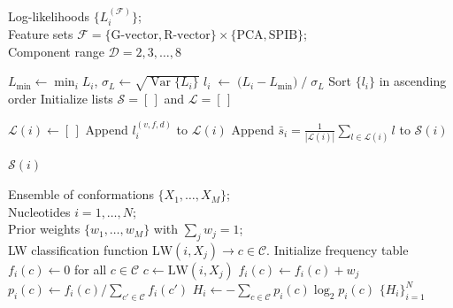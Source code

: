 \begin{algorithm}[H]
  \caption{RNAnneal Score}
  \label{ch6:alg:rnanneal-score}
  \begin{algorithmic}[1]
    \REQUIRE
    Log-likelihoods $\{L_{i}^{(\mathcal{F})}\}$;\\
    Feature sets $\mathcal{F}=\{\text{G-vector},\text{R-vector}\}\times\{\text{PCA},\text{SPIB}\}$;\\
    Component range $\mathcal{D}=2,3,\ldots,8$

    \STATE $\displaystyle L_{\min}\leftarrow\min_{i}L_{i}$,\quad
           $\displaystyle\sigma_{L}\leftarrow\sqrt{\operatorname{Var}\{L_{i}\}}$
      \STATE $\displaystyle l_{i}\;\leftarrow\;
              {\bigl(L_{i}-L_{\min}\bigr)}\;
              {/\;\sigma_{L}}$ 
    \ENDFOR
      \STATE Sort $\{l_{i}\}$ in ascending order
      \STATE Initialize lists $\mathcal{S} = [\,]$ and $\mathcal{L} = [\,]$

        \STATE $\mathcal{L}(i)\gets[\,]$
              \STATE Append $l_{i}^{(v,f,d)}$ to $\mathcal{L}(i)$
            \ENDFOR
          \ENDFOR
        \STATE Append {$\displaystyle\bar{s}_{i}
               = \frac{1}{|\mathcal{L}(i)|}\sum_{l\in\mathcal{L}(i)}l$} to ${\mathcal{S}}(i)$

      \ENDFOR
      \RETURN ${\mathcal{S}}(i)$
  \end{algorithmic}
\end{algorithm}

\begin{algorithm}[H]
  \caption{Interaction Entropy calculation}
  \label{ch6:alg:interaction-entropy}
  \begin{algorithmic}[1]
    \REQUIRE Ensemble of conformations $\{X_{1},\dots,X_{M}\}$;\\
             Nucleotides $i=1,\dots,N$; \\
             Prior weights $\{w_{1},\dots,w_{M}\}$ with $\sum_{j} w_{j}=1$; \\
             LW classification function $\mathrm{LW}(i,X_{j}) \rightarrow c \in \mathcal{C}$.
      \STATE Initialize frequency table $f_{i}(c) \gets 0$ for all $c \in \mathcal{C}$
        \STATE $c \gets \mathrm{LW}(i,X_{j})$
        \STATE $f_{i}(c) \gets f_{i}(c) + w_{j}$
      \ENDFOR
      \STATE $p_{i}(c) \gets f_{i}(c) / \sum_{c' \in \mathcal{C}} f_{i}(c')$ 
      \STATE $H_{i} \gets -\sum_{c \in \mathcal{C}} p_{i}(c) \log_2 p_{i}(c)$
    \ENDFOR
    \RETURN $\{H_{i}\}_{i=1}^{N}$ 
  \end{algorithmic}
\end{algorithm}

